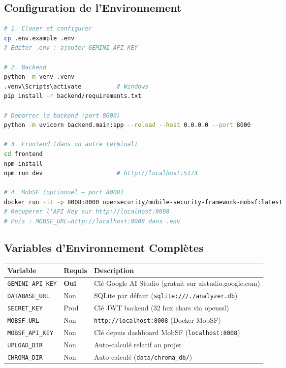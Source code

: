 \documentclass[12pt,a4paper,french]{article}
\begin{document}
\subsection{Configuration de l'Environnement}

\begin{lstlisting}[language=bash, caption={Installation et démarrage du projet}]
# 1. Cloner et configurer
cp .env.example .env
# Editer .env : ajouter GEMINI_API_KEY

# 2. Backend
python -m venv .venv
.venv\Scripts\activate          # Windows
pip install -r backend/requirements.txt

# Demarrer le backend (port 8000)
python -m uvicorn backend.main:app --reload --host 0.0.0.0 --port 8000

# 3. Frontend (dans un autre terminal)
cd frontend
npm install
npm run dev                     # http://localhost:5173

# 4. MobSF (optionnel — port 8008)
docker run -it -p 8008:8000 opensecurity/mobile-security-framework-mobsf:latest
# Recuperer l'API Key sur http://localhost:8008
# Puis : MOBSF_URL=http://localhost:8008 dans .env
\end{lstlisting}

\subsection{Variables d'Environnement Complètes}

\begin{center}
\renewcommand{\arraystretch}{1.4}
\begin{tabular}{llp{5cm}}
\toprule
\textbf{Variable} & \textbf{Requis} & \textbf{Description} \\
\midrule
\rowcolor{red!6}
\texttt{GEMINI\_API\_KEY} & \textbf{Oui} & Clé Google AI Studio (gratuit sur aistudio.google.com) \\
\texttt{DATABASE\_URL} & Non & SQLite par défaut (\texttt{sqlite:///./analyzer.db}) \\
\rowcolor{primary!5}
\texttt{SECRET\_KEY} & Prod & Clé JWT backend (32 hex chars via openssl) \\
\texttt{MOBSF\_URL} & Non & \texttt{http://localhost:8008} (Docker MobSF) \\
\rowcolor{primary!5}
\texttt{MOBSF\_API\_KEY} & Non & Clé depuis dashboard MobSF (\texttt{localhost:8008}) \\
\texttt{UPLOAD\_DIR} & Non & Auto-calculé relatif au projet \\
\rowcolor{primary!5}
\texttt{CHROMA\_DIR} & Non & Auto-calculé (\texttt{data/chroma\_db/}) \\
\bottomrule
\end{tabular}
\end{center}
\end{document}

